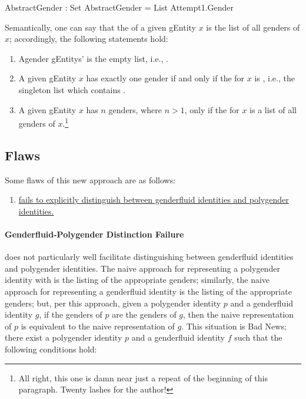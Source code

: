 \documentclass{article}
\theoremstyle{remark}
\begin{document}
\begin{code}
  AbstractGender : Set
  AbstractGender = List Attempt1.Gender
\end{code}

Semantically, one can say that the  of a given \gls{gEntity} \(x\) is the list of all genders of \(x\); accordingly, the following statements hold:

\begin{enumerate}
  \item Agender \glspl{gEntity}'  is the empty list, i.e., \AgdaInductiveConstructor{[]}.
  \item A given \gls{gEntity} \(x\) has exactly one gender  if and only if the  for \(x\) is \AgdaOperator{\AgdaFunction{[}}  \AgdaOperator{\AgdaFunction{]}}, i.e., the singleton list which contains .
  \item A given \gls{gEntity} \(x\) has \(n\) genders, where \(n > 1\), only if the  for \(x\) is a list of all genders of \(x\).\footnote{All right, this one is damn near just a repeat of the beginning of this paragraph.  Twenty lashes for the author!}
\end{enumerate}

\subsection{Flaws}\label{sec:gender2flaws}
Some flaws of this new approach are as follows:

\begin{enumerate}
  \item \hyperref[sec:gender3DistinctionFailure]{ fails to explicitly distinguish between genderfluid identities and polygender identities.}\label{enum:gender2genderfluidOrPolygender}
\end{enumerate}

\paragraph{Genderfluid-Polygender Distinction Failure}\label{sec:gender3DistinctionFailure}
 does not particularly well facilitate distinguishing between genderfluid identities and polygender identities.  The naive approach for representing a polygender identity with  is the listing of the appropriate genders; similarly, the naive approach for representing a genderfluid identity is the listing of the appropriate genders; but, per this approach, given a polygender identity \(p\) and a genderfluid identity \(g\), if the genders of \(p\) are the genders of \(g\), then the naive  representation of \(p\) is equivalent to the naive  representation of \(g\).  This situation is Bad News; there exist a polygender identity \(p\) and a genderfluid identity \(f\) such that the following conditions hold:
\end{document}
